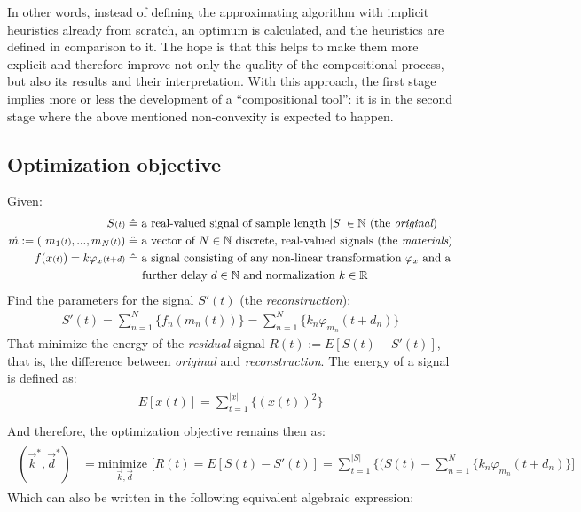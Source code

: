 \documentclass[11pt]{scrartcl} %
\begin{document}
In other words, instead of defining the approximating algorithm with implicit heuristics already from scratch, an optimum is calculated, and the heuristics are defined in comparison to it. The hope is that this helps to make them more explicit and therefore improve not only the quality of the compositional process, but also its results and their interpretation. With this approach, the first stage implies more or less the development of a ``compositional tool'': it is in the second stage where the above mentioned non-convexity is expected to happen.
\subsection*{Optimization objective}
Given:
\begin{align*}
    \begin{aligned}
      S{\scriptstyle (t)} \;&\hat{=} \text{ a real-valued signal of sample length } |S| \in \mathbb{N} \text{ (the {\it original})}\\
      \vec{m} := (\ m_1{\scriptstyle (t)}, ..., m_N{\scriptstyle (t)}) \;&\hat{=} \text{ a vector of \(N\in\mathbb{N}\) discrete, real-valued signals (the {\it materials})}\\
      f(x{\scriptstyle (t)}) = k
      \varphi_x{\scriptstyle (t+d)} \;&\hat{=} \text{ a signal consisting of any non-linear transformation } \varphi_x \text{ and a}\\
        &\phantom{\quad\,}\text{further delay } d\in\mathbb{N} \text{ and normalization } k\in\mathbb{R} \notag\\ %
    \end{aligned}
\end{align*}
Find the parameters for the signal \(S'{\scriptstyle (t)}\) (the {\it reconstruction}):
  \begin{align*}
    S'{\scriptstyle (t)} = \sum_{n=1}^N\{f_n(m_n{\scriptstyle (t)})\} = \sum_{n=1}^N\{k_n\varphi_{m_n}{\scriptstyle (t+d_n)}\}
  \end{align*}
  That minimize the energy of the {\it residual} signal \(R{\scriptstyle (t)} := E[S{\scriptstyle (t)}-S'{\scriptstyle (t)}]\), that is, the difference between  {\it original} and {\it reconstruction}. The energy of a signal is defined as:
  \begin{align*}
    \begin{aligned}
      E[x{\scriptstyle (t)}] = \sum_{t=1}^{|x|}\{(x{\scriptstyle (t)})^2\}\\[15pt]
    \end{aligned}
  \end{align*}
  And therefore, the optimization objective remains then as:
  \begin{align*}
    \begin{aligned}
      (\vec{k}^*, \vec{d}^*) &= \underset{\vec{k}, \vec{d}}{\text{minimize }}\Bigg[
      R{\scriptstyle (t)} = E[S{\scriptstyle (t)}-S'{\scriptstyle (t)}]
      = \sum_{t=1}^{|S|}\bigg\{\Big(S{\scriptstyle (t)}-\sum_{n=1}^N\{k_n\varphi_{m_n}{\scriptstyle (t+d_n)}\}\Bigg]
    \end{aligned}
  \end{align*}
  Which can also be written in the following equivalent algebraic expression:
  
\end{document}
